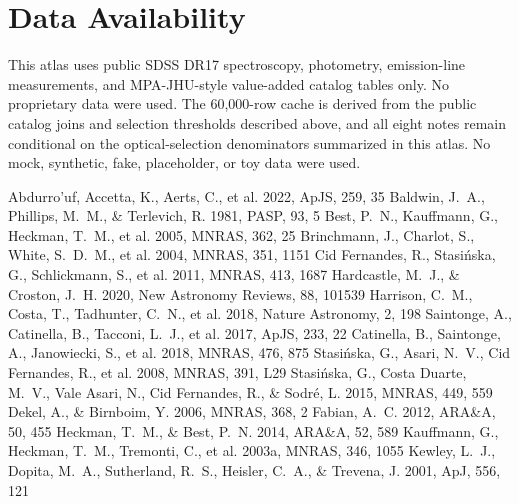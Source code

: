 \documentclass[twocolumn]{aastex631}
\begin{document}
\section*{Data Availability}
This atlas uses public SDSS DR17 spectroscopy, photometry, emission-line measurements, and MPA-JHU-style value-added catalog tables only. No proprietary data were used. The 60,000-row cache is derived from the public catalog joins and selection thresholds described above, and all eight notes remain conditional on the optical-selection denominators summarized in this atlas. No mock, synthetic, fake, placeholder, or toy data were used.


\begin{thebibliography}{}
 Abdurro'uf, Accetta, K., Aerts, C., et al. 2022, ApJS, 259, 35
 Baldwin, J.~A., Phillips, M.~M., \& Terlevich, R. 1981, PASP, 93, 5
 Best, P.~N., Kauffmann, G., Heckman, T.~M., et al. 2005, MNRAS, 362, 25
 Brinchmann, J., Charlot, S., White, S.~D.~M., et al. 2004, MNRAS, 351, 1151
 Cid Fernandes, R., Stasi{\'n}ska, G., Schlickmann, S., et al. 2011, MNRAS, 413, 1687
 Hardcastle, M.~J., \& Croston, J.~H. 2020, New Astronomy Reviews, 88, 101539
 Harrison, C.~M., Costa, T., Tadhunter, C.~N., et al. 2018, Nature Astronomy, 2, 198
 Saintonge, A., Catinella, B., Tacconi, L.~J., et al. 2017, ApJS, 233, 22
 Catinella, B., Saintonge, A., Janowiecki, S., et al. 2018, MNRAS, 476, 875
 Stasi{\'n}ska, G., Asari, N.~V., Cid Fernandes, R., et al. 2008, MNRAS, 391, L29
 Stasi{\'n}ska, G., Costa Duarte, M.~V., Vale Asari, N., Cid Fernandes, R., \& Sodr{\'e}, L. 2015, MNRAS, 449, 559
 Dekel, A., \& Birnboim, Y. 2006, MNRAS, 368, 2
 Fabian, A.~C. 2012, ARA\&A, 50, 455
 Heckman, T.~M., \& Best, P.~N. 2014, ARA\&A, 52, 589
 Kauffmann, G., Heckman, T.~M., Tremonti, C., et al. 2003a, MNRAS, 346, 1055
 Kewley, L.~J., Dopita, M.~A., Sutherland, R.~S., Heisler, C.~A., \& Trevena, J. 2001, ApJ, 556, 121

\end{thebibliography}
\end{document}
